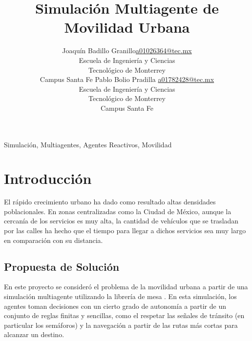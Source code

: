 \documentclass[twoside,11pt]{article}
\newcommand{\myname}{Joaquín Badillo Granillo}
\begin{document}
\renewcommand{\tablename}{Tabla}

\title{Simulación Multiagente de Movilidad Urbana}

\author{\name \myname \email \href{mailto:a01026364@tec.mx}{a01026364@tec.mx} \\
       \addr Escuela de Ingeniería y Ciencias\\
       Tecnológico de Monterrey\\
       Campus Santa Fe
       \AND
       \name Pablo Bolio Pradilla \email \href{mailto:a01782428@tec.mx}{a01782428@tec.mx} \\
       \addr Escuela de Ingeniería y Ciencias\\
       Tecnológico de Monterrey\\
       Campus Santa Fe
       }

\maketitle

\begin{abstract}
    
\end{abstract}

\begin{keywords}
  Simulación, Multiagentes, Agentes Reactivos, Movilidad
\end{keywords}

\section{Introducción}
El rápido crecimiento urbano ha dado como resultado altas densidades poblacionales.
En zonas centralizadas como la Ciudad de México, aunque la cercanía de los servicios
es muy alta, la cantidad de vehículos que se trasladan por las calles ha hecho que
el tiempo para llegar a dichos servicios sea muy largo en comparación con su distancia.

\subsection{Propuesta de Solución}
En este proyecto se consideró el problema de la movilidad urbana a partir de una simulación
multiagente utilizando la librería de mesa \cite[]{python-mesa-2020}. En esta simulación,
los agentes toman decisiones con un cierto grado de autonomía a partir de un conjunto de reglas
finitas y sencillas, como el respetar las señales de tránsito (en particular los semáforos) y 
la navegación a partir de las rutas más cortas para alcanzar un destino.
\end{document}
